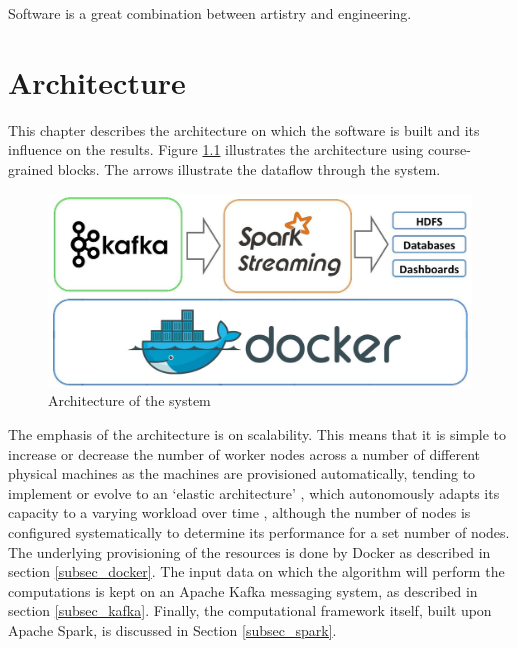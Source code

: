 \begin{savequote}[90mm] 
Software is a great combination between artistry and engineering.  
\end{savequote}

\chapter{Architecture \label{chap3:architecture}}

This chapter describes the architecture on which the software is built and its influence on the results. Figure \ref{fig:architecture} illustrates the architecture using course-grained blocks. The arrows illustrate the dataflow through the system. 

\begin{figure}[ht!]
\centering
\includegraphics[width=\textwidth]{figures/architecture.jpg}
\caption{Architecture of the system}
\label{fig:architecture}
\end{figure}

The emphasis of the architecture is on scalability. This means that it is simple to increase or decrease the number of worker nodes across a number of different physical machines as the machines are provisioned automatically, tending to implement or evolve to an `elastic architecture' \cite{9780470887998}, which autonomously adapts its capacity to a varying workload over time \cite{180145}, although the number of nodes is configured systematically to determine its performance for a set number of nodes. The underlying provisioning of the resources is done by Docker as described in section \ref{subsec_docker}. The input data on which the algorithm will perform the computations is kept on an Apache Kafka messaging system, as described in section \ref{subsec_kafka}. Finally, the computational framework itself, built upon Apache Spark, is discussed in Section \ref{subsec_spark}.

